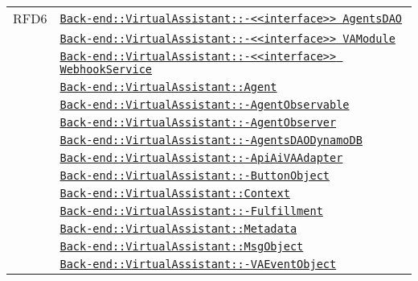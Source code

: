 \begin{longtable}{|>{\centering}m{3cm}|m{10cm}<{\centering}|}
RFD6 & \hyperref[Back-end::VirtualAssistant::<<interface>> AgentsDAO]{\texttt{Back-end::VirtualAssistant::-\linebreak <<interface>> AgentsDAO}}\\
& \hyperref[Back-end::VirtualAssistant::<<interface>> VAModule]{\texttt{Back-end::VirtualAssistant::-\linebreak <<interface>> VAModule}}\\
& \hyperref[Back-end::VirtualAssistant::<<interface>> WebhookService]{\texttt{Back-end::VirtualAssistant::-\linebreak <<interface>> WebhookService}}\\
& \hyperref[Back-end::VirtualAssistant::Agent]{\texttt{Back-end::VirtualAssistant::Agent}}\\
& \hyperref[Back-end::VirtualAssistant::AgentObservable]{\texttt{Back-end::VirtualAssistant::-\linebreak AgentObservable}}\\
& \hyperref[Back-end::VirtualAssistant::AgentObserver]{\texttt{Back-end::VirtualAssistant::-\linebreak AgentObserver}}\\
& \hyperref[Back-end::VirtualAssistant::AgentsDAODynamoDB]{\texttt{Back-end::VirtualAssistant::-\linebreak AgentsDAODynamoDB}}\\
& \hyperref[Back-end::VirtualAssistant::ApiAiVAAdapter]{\texttt{Back-end::VirtualAssistant::-\linebreak ApiAiVAAdapter}}\\
& \hyperref[Back-end::VirtualAssistant::ButtonObject]{\texttt{Back-end::VirtualAssistant::-\linebreak ButtonObject}}\\
& \hyperref[Back-end::VirtualAssistant::Context]{\texttt{Back-end::VirtualAssistant::Context}}\\
& \hyperref[Back-end::VirtualAssistant::Fulfillment]{\texttt{Back-end::VirtualAssistant::-\linebreak Fulfillment}}\\
& \hyperref[Back-end::VirtualAssistant::Metadata]{\texttt{Back-end::VirtualAssistant::Metadata}}\\
& \hyperref[Back-end::VirtualAssistant::MsgObject]{\texttt{Back-end::VirtualAssistant::MsgObject}}\\
& \hyperref[Back-end::VirtualAssistant::VAEventObject]{\texttt{Back-end::VirtualAssistant::-\linebreak VAEventObject}}\\

\end{longtable}
